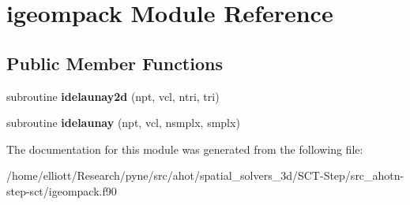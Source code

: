 \hypertarget{classigeompack}{\section{igeompack Module Reference}
\label{classigeompack}
}
\subsection*{Public Member Functions}
\begin{DoxyCompactItemize}
\item 
\hypertarget{classigeompack_af1c735d960955c236182dc083e4e9840}{subroutine {\bfseries idelaunay2d} (npt, vcl, ntri, tri)}\label{classigeompack_af1c735d960955c236182dc083e4e9840}

\item 
\hypertarget{classigeompack_a5afd38aaf62a7dc9d576f59edb07ef93}{subroutine {\bfseries idelaunay} (npt, vcl, nsmplx, smplx)}\label{classigeompack_a5afd38aaf62a7dc9d576f59edb07ef93}

\end{DoxyCompactItemize}


The documentation for this module was generated from the following file\-:\begin{DoxyCompactItemize}
\item 
/home/elliott/\-Research/pyne/src/ahot/spatial\-\_\-solvers\-\_\-3d/\-S\-C\-T-\/\-Step/src\-\_\-ahotn-\/step-\/sct/igeompack.\-f90\end{DoxyCompactItemize}
